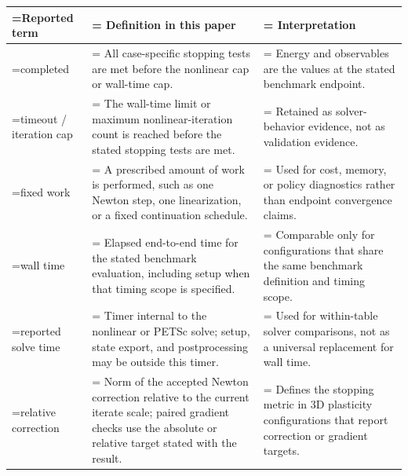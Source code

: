 \begin{tabularx}{\textwidth}{@{}>{\hsize=0.620\hsize\linewidth=\hsize\RaggedRight\arraybackslash}X>{\hsize=1.330\hsize\linewidth=\hsize\RaggedRight\arraybackslash}X>{\hsize=1.050\hsize\linewidth=\hsize\RaggedRight\arraybackslash}X@{}}
\toprule
Reported term & Definition in this paper & Interpretation \\
\midrule
completed & All case-specific stopping tests are met before the nonlinear cap or wall-time cap. & Energy and observables are the values at the stated benchmark endpoint. \\
timeout / iteration cap & The wall-time limit or maximum nonlinear-iteration count is reached before the stated stopping tests are met. & Retained as solver-behavior evidence, not as validation evidence. \\
fixed work & A prescribed amount of work is performed, such as one Newton step, one linearization, or a fixed continuation schedule. & Used for cost, memory, or policy diagnostics rather than endpoint convergence claims. \\
wall time & Elapsed end-to-end time for the stated benchmark evaluation, including setup when that timing scope is specified. & Comparable only for configurations that share the same benchmark definition and timing scope. \\
reported solve time & Timer internal to the nonlinear or PETSc solve; setup, state export, and postprocessing may be outside this timer. & Used for within-table solver comparisons, not as a universal replacement for wall time. \\
relative correction & Norm of the accepted Newton correction relative to the current iterate scale; paired gradient checks use the absolute or relative target stated with the result. & Defines the stopping metric in 3D plasticity configurations that report correction or gradient targets. \\
\bottomrule
\end{tabularx}
